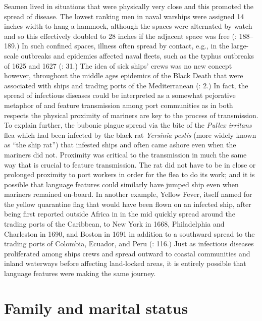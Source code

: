 Seamen lived in situations that were physically very close and this promoted the spread of disease. The lowest ranking men in naval warships were assigned 14 inches width to hang a hammock, although the spaces were alternated by watch and so this effectively doubled to 28 inches if the adjacent space was free (\citealt{AdkinsAdkins2008}: 188--189.) In such confined spaces, illness often spread by contact, e.g., in the  large-scale outbreaks and epidemics affected naval fleets, such as the typhus outbreaks of 1625 and 1627 (\citealt{Brown2011}: 31.) The idea of sick ships’ crews was no new concept however, throughout the middle ages epidemics of the Black Death that were associated with ships and trading ports of the Mediterranean (\citealt{Brown2011}: 2.) In fact, the spread of infectious diseases could be interpreted as a somewhat pejorative metaphor of  and feature transmission among port communities as in both respects the physical proximity of mariners are key to the process of transmission. To explain further, the bubonic plague spread via the bite of the \textit{Pullex irritans} flea which had been infected by the black rat \textit{Yersinia pestis} (more widely known as “the ship rat”) that infested  ships and often came ashore even when the mariners did not. Proximity was critical to the transmission in much the same way that  is crucial to feature transmission. The rat did not have to be in close or prolonged proximity to port workers in order for the flea to do its work; and it is possible that language features could similarly have jumped ship even when mariners remained on-board. In another example, Yellow Fever, itself named for the yellow quarantine flag that would have been flown on an infected ship, after being first reported outside Africa in  in the mid  quickly spread around the trading ports of the Caribbean, to New York in 1668, Philadelphia and Charleston in 1690, and Boston in 1691 in addition to a southward spread to the trading ports of Colombia, Ecuador, and Peru (\citealt{Brown2011}: 116.) Just as infectious diseases proliferated among ships crews and spread outward to coastal communities and inland waterways before affecting land-locked areas, it is entirely possible that language features were making the same journey. 

\section{{Family and marital status}}\label{sec:3.6}

